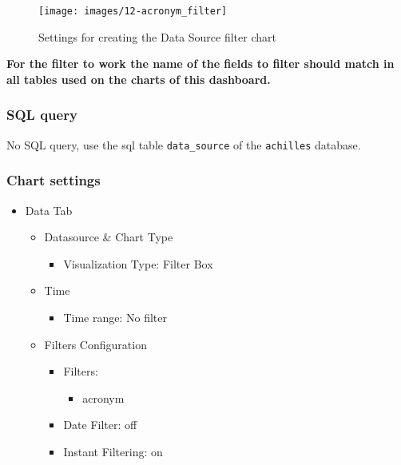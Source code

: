 \documentclass[
]{book}
\providecommand{\tightlist}{%
  \setlength{\itemsep}{0pt}\setlength{\parskip}{0pt}}
\begin{document}
\begin{figure}
\texttt{[image: images/12-acronym\_filter]} \caption{Settings for creating the Data Source filter chart}\label{fig:dataSourceFilter}
\end{figure}

\textbf{For the filter to work the name of the fields to filter should match in all tables used on the charts of this dashboard.}

\hypertarget{sql-query-7}{%
\subsubsection*{SQL query}\label{sql-query-7}}

No SQL query, use the sql table \texttt{data\_source} of the \texttt{achilles} database.

\hypertarget{chart-settings-8}{%
\subsubsection*{Chart settings}\label{chart-settings-8}}

\begin{itemize}
\tightlist
\item
  Data Tab

  \begin{itemize}
  \tightlist
  \item
    Datasource \& Chart Type

    \begin{itemize}
    \tightlist
    \item
      Visualization Type: Filter Box
    \end{itemize}
  \item
    Time

    \begin{itemize}
    \tightlist
    \item
      Time range: No filter
    \end{itemize}
  \item
    Filters Configuration

    \begin{itemize}
    \tightlist
    \item
      Filters:

      \begin{itemize}
      \tightlist
      \item
        acronym
      \end{itemize}
    \item
      Date Filter: off
    \item
      Instant Filtering: on
    \end{itemize}
  \end{itemize}
\end{itemize}
\end{document}
